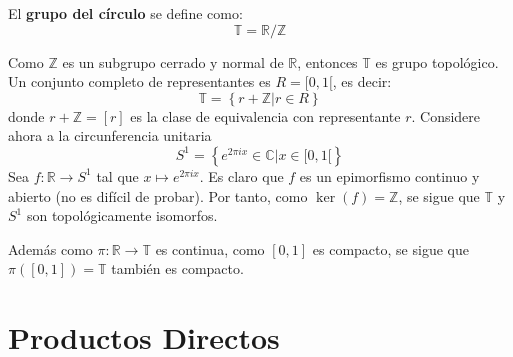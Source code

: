 \documentclass[12pt]{report}
\theoremstyle{largebreak}
\newcommand{\cf}[3]{\ensuremath{#1:#2\rightarrow#3}}
\begin{document}
    \begin{mydef}
        El \textbf{grupo del círculo} se define como:
        \begin{equation*}
            \mathbb{T}=\mathbb{R}/\mathbb{Z}
        \end{equation*}
    \end{mydef}

    \begin{obs}
        Como $\mathbb{Z}$ es un subgrupo cerrado y normal de $\mathbb{R}$, entonces $\mathbb{T}$ es grupo topológico. Un conjunto completo de representantes es $R=[0,1[$, es decir:
        \begin{equation*}
            \mathbb{T}=\left\{r+\mathbb{Z}\Big|r\in R \right\}
        \end{equation*} 
        donde $r+\mathbb{Z}=\left[r\right]$ es la clase de equivalencia con representante $r$.
        Considere ahora a la circunferencia unitaria
        \begin{equation*}
            S^1=\left\{e^{2\pi ix}\in\mathbb{C}\Big|x\in[0,1[ \right\}
        \end{equation*}
        Sea $\cf{f}{\mathbb{R}}{S^1}$ tal que $x\mapsto e^{2\pi ix}$. Es claro que $f$ es un epimorfismo continuo y abierto (no es difícil de probar). Por tanto, como $\ker\left(f\right)=\mathbb{Z}$, se sigue que $\mathbb{T}$ y $S^1$ son topológicamente isomorfos.

        Además como $\cf{\pi}{\mathbb{R}}{\mathbb{T}}$ es continua, como $[0,1]$ es compacto, se sigue que $\pi([0,1])=\mathbb{T}$ también es compacto.
    \end{obs}

    \section{Productos Directos}
\end{document}
